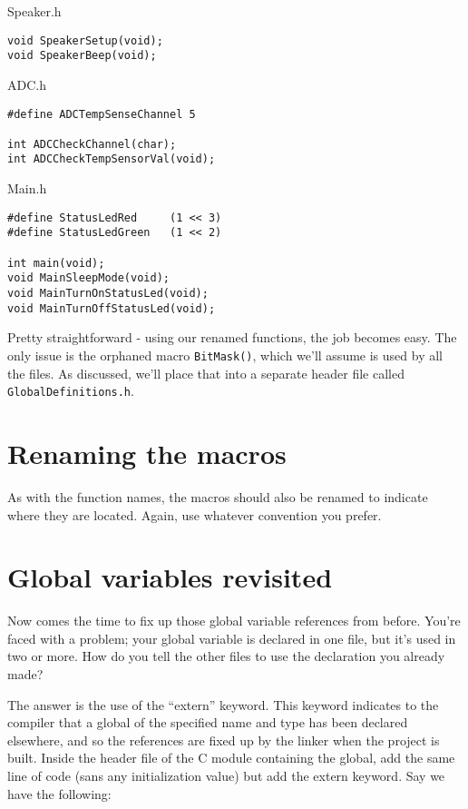 \documentclass[a4paper,oneside,notitlepage]{article}
\begin{document}
Speaker.h
\begin{center}
\begin{lstlisting}
void SpeakerSetup(void);
void SpeakerBeep(void);
\end{lstlisting}
\end{center}

ADC.h
\begin{center}
\begin{lstlisting}
#define ADCTempSenseChannel 5

int ADCCheckChannel(char);
int ADCCheckTempSensorVal(void);
\end{lstlisting}
\end{center}

Main.h
\begin{center}
\begin{lstlisting}
#define StatusLedRed     (1 << 3)
#define StatusLedGreen   (1 << 2)

int main(void);
void MainSleepMode(void);
void MainTurnOnStatusLed(void);
void MainTurnOffStatusLed(void);
\end{lstlisting}
\end{center}

Pretty straightforward - using our renamed functions, the job becomes easy. The only issue is the orphaned macro \texttt{BitMask()}, which we'll assume is used by all the files. As discussed, we'll place that into a separate header file called \texttt{GlobalDefinitions.h}.

\section{Renaming the macros}

As with the function names, the macros should also be renamed to indicate where they are located. Again, use whatever convention you prefer.

\section{Global variables revisited}

Now comes the time to fix up those global variable references from before. You're faced with a problem; your global variable is declared in one file, but it's used in two or more. How do you tell the other files to use the declaration you already made?

The answer is the use of the ``extern'' keyword. This keyword indicates to the compiler that a global of the specified name and type has been declared elsewhere, and so the references are fixed up by the linker when the project is built. Inside the header file of the C module containing the global, add the same line of code (sans any initialization value) but add the extern keyword. Say we have the following:
\end{document}
